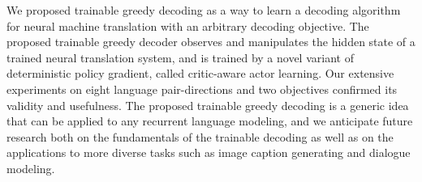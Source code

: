 We proposed trainable greedy decoding as a way to learn a decoding algorithm for neural machine translation with an arbitrary decoding objective. The proposed trainable greedy decoder observes and manipulates the hidden state of a trained neural translation system, and is trained by a novel variant of deterministic policy gradient, called critic-aware actor learning. Our extensive experiments on eight language pair-directions and two objectives confirmed its validity and usefulness. The proposed trainable greedy decoding is a generic idea that can be applied to any recurrent language modeling, and we anticipate future research both on the fundamentals of the trainable decoding as well as on the applications to more diverse tasks such as image caption generating and dialogue modeling.
